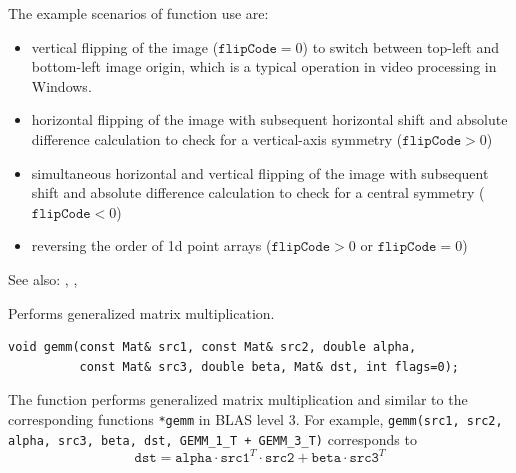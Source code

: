 The example scenarios of function use are:
\begin{itemize}
  \item vertical flipping of the image ($\texttt{flipCode} = 0$) to switch between top-left and bottom-left image origin, which is a typical operation in video processing in Windows.
  \item horizontal flipping of the image with subsequent horizontal shift and absolute difference calculation to check for a vertical-axis symmetry ($\texttt{flipCode} > 0$)
  \item simultaneous horizontal and vertical flipping of the image with subsequent shift and absolute difference calculation to check for a central symmetry ($\texttt{flipCode} < 0$)
  \item reversing the order of 1d point arrays ($\texttt{flipCode} > 0$ or $\texttt{flipCode} = 0$)
\end{itemize}

See also: , , 

\label{gemm}
Performs generalized matrix multiplication.

\begin{lstlisting}
void gemm(const Mat& src1, const Mat& src2, double alpha,
          const Mat& src3, double beta, Mat& dst, int flags=0);
\end{lstlisting}
\begin{description}
\end{description}

The function performs generalized matrix multiplication and similar to the corresponding functions \texttt{*gemm} in BLAS level 3.
For example, \texttt{gemm(src1, src2, alpha, src3, beta, dst, GEMM\_1\_T + GEMM\_3\_T)} corresponds to
\[
\texttt{dst} = \texttt{alpha} \cdot \texttt{src1} ^T \cdot \texttt{src2} + \texttt{beta} \cdot \texttt{src3} ^T
\]

